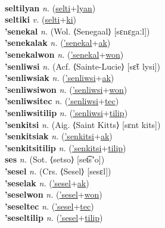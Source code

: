  \label{seltilum} \\
\textbf{seltilyan} \textit{n.} (\hyperref[selti]{selti}+\hyperref[lyan]{lyan})
 \label{seltilyan} \\
\textbf{seltiki} \textit{v.} (\hyperref[selti]{selti}+\hyperref[ki]{ki})
 \label{seltiki} \\
\textbf{'senekal} \textit{n.} (Wol. ⟨Senegaal⟩ [sɛnɛgaːl])
 \label{'senekal} \\
\textbf{'senekalak} \textit{n.} (\hyperref['senekal]{'senekal}+\hyperref[ak]{ak})
 \label{'senekalak} \\
\textbf{'senekalwon} \textit{n.} (\hyperref['senekal]{'senekal}+\hyperref[won]{won})
 \label{'senekalwon} \\
\textbf{'senliwsi} \textit{n.} (Acf. ⟨Sainte-Lucie⟩ [sɛ̃t lysi])
 \label{'senliwsi} \\
\textbf{'senliwsiak} \textit{n.} (\hyperref['senliwsi]{'senliwsi}+\hyperref[ak]{ak})
 \label{'senliwsiak} \\
\textbf{'senliwsiwon} \textit{n.} (\hyperref['senliwsi]{'senliwsi}+\hyperref[won]{won})
 \label{'senliwsiwon} \\
\textbf{'senliwsitec} \textit{n.} (\hyperref['senliwsi]{'senliwsi}+\hyperref[tec]{tec})
 \label{'senliwsitec} \\
\textbf{'senliwsitilip} \textit{n.} (\hyperref['senliwsi]{'senliwsi}+\hyperref[tilip]{tilip})
 \label{'senliwsitilip} \\
\textbf{'senkitsi} \textit{n.} (Aig. ⟨Saint Kitts⟩ [sɛnt kits])
 \label{'senkitsi} \\
\textbf{'senkitsiak} \textit{n.} (\hyperref['senkitsi]{'senkitsi}+\hyperref[ak]{ak})
 \label{'senkitsiak} \\
\textbf{'senkitsitilip} \textit{n.} (\hyperref['senkitsi]{'senkitsi}+\hyperref[tilip]{tilip})
 \label{'senkitsitilip} \\
\textbf{ses} \textit{n.} (Sot. ⟨setso⟩ [set͡sʼo])
 \label{ses} \\
\textbf{'sesel} \textit{n.} (Crs. ⟨Sesel⟩ [sesɛl])
 \label{'sesel} \\
\textbf{'seselak} \textit{n.} (\hyperref['sesel]{'sesel}+\hyperref[ak]{ak})
 \label{'seselak} \\
\textbf{'seselwon} \textit{n.} (\hyperref['sesel]{'sesel}+\hyperref[won]{won})
 \label{'seselwon} \\
\textbf{'seseltec} \textit{n.} (\hyperref['sesel]{'sesel}+\hyperref[tec]{tec})
 \label{'seseltec} \\
\textbf{'seseltilip} \textit{n.} (\hyperref['sesel]{'sesel}+\hyperref[tilip]{tilip})
